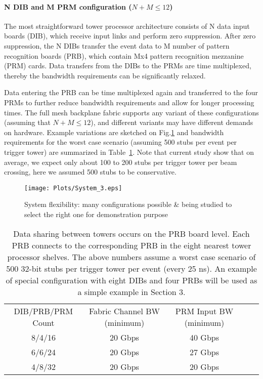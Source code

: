 \paragraph{N DIB and M PRM configuration ($N+M \le 12$)}

\noindent The most straightforward tower processor architecture consists of N data input boards (DIB), which receive input links and perform zero suppression.  After zero suppression, the N DIBs transfer the event data to M number of pattern recognition boards (PRB), which contain Mx4 pattern recognition mezzanine (PRM) cards.  Data transfers from the DIBs to the PRMs are time multiplexed, thereby the bandwidth requirements can be significantly relaxed.  

\noindent Data entering the PRB can be time multiplexed again and transferred to the four PRMs to further reduce bandwidth requirements and allow for longer processing times.  The full mesh backplane fabric supports any variant of these configurations (assuming that $N+M \le 12$), and different variants may have different demands on hardware. Example variations are sketched on Fig.\ref{fig:System_3} and bandwidth requirements for the worst case scenario (assuming 500 stubs per event per trigger tower) are summarized in Table~\ref{tab:shelves}. Note that current study show that on average, we expect only about 100 to 200 stubs per trigger tower per beam crossing, here we assumed 500 stubs to be conservative. 

\begin{figure}[ht!]
\centering
\texttt{[image: Plots/System\_3.eps]}
\caption{System flexibility: many configurations possible \& being studied to select the right one for demonstration purpose}
\label{fig:System_3}
\end{figure}


\begin{table}[ht!]
\centering\begin{tabular}{|c|c|c|c|c|}
\hline
DIB/PRB/PRM Count &  Fabric Channel BW (minimum)  &	PRM Input BW (minimum) \\
8/4/16 &	20 Gbps &	40 Gbps \\
6/6/24 &	20 Gbps &	27 Gbps \\
4/8/32 &	20 Gbps &	20 Gbps \\
\hline
\end{tabular}
\caption{Data sharing between towers occurs on the PRB board level.  Each PRB connects to the corresponding PRB in the eight nearest tower processor shelves.  The above numbers assume a worst case scenario of 500 32-bit stubs per trigger tower per event (every 25 ns).  An example of special configuration with eight DIBs and four PRBs will be used as a simple example in Section 3.}
\label{tab:shelves}
\end{table}


